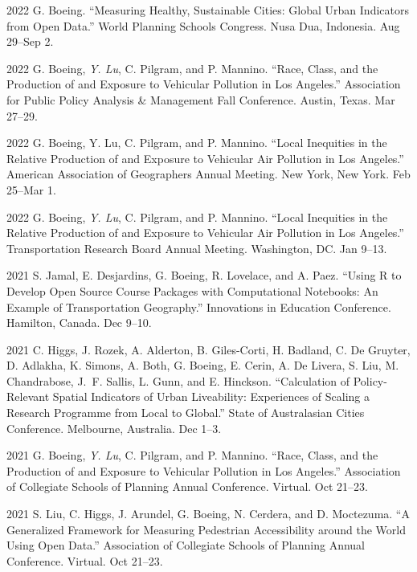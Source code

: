 \documentclass[11pt,letterpaper]{report} %
\begin{document}
\begin{tablist}
        \item[2022] \tab{}G. Boeing. \enquote{Measuring Healthy, Sustainable Cities: Global Urban Indicators from Open Data.} World Planning Schools Congress. Nusa Dua, Indonesia. Aug 29--Sep 2.

        \item[2022] \tab{}G. Boeing, \textit{Y. Lu}, C. Pilgram, and P. Mannino. \enquote{Race, Class, and the Production of and Exposure to Vehicular Pollution in Los Angeles.} Association for Public Policy Analysis \& Management Fall Conference. Austin, Texas. Mar 27--29.

        \item[2022] \tab{}G. Boeing, Y. Lu, C. Pilgram, and P. Mannino. \enquote{Local Inequities in the Relative Production of and Exposure to Vehicular Air Pollution in Los Angeles.} American Association of Geographers Annual Meeting. New York, New York. Feb 25--Mar 1.

        \item[2022] \tab{}G. Boeing, \textit{Y. Lu}, C. Pilgram, and P. Mannino. \enquote{Local Inequities in the Relative Production of and Exposure to Vehicular Air Pollution in Los Angeles.} Transportation Research Board Annual Meeting. Washington, DC\@. Jan 9--13.

        \item[2021] \tab{}S. Jamal, E. Desjardins, G. Boeing, R. Lovelace, and A. Paez. \enquote{Using R to Develop Open Source Course Packages with Computational Notebooks: An Example of Transportation Geography.} Innovations in Education Conference. Hamilton, Canada. Dec 9--10.

        \item[2021] \tab{}C. Higgs, J. Rozek, A. Alderton, B. Giles-Corti, H. Badland, C. De Gruyter, D. Adlakha, K. Simons, A. Both, G. Boeing, E. Cerin, A. De Livera, S. Liu, M. Chandrabose, J.~F. Sallis, L. Gunn, and E. Hinckson. \enquote{Calculation of Policy-Relevant Spatial Indicators of Urban Liveability: Experiences of Scaling a Research Programme from Local to Global.} State of Australasian Cities Conference. Melbourne, Australia. Dec 1--3.

        \item[2021] \tab{}G. Boeing, \textit{Y. Lu}, C. Pilgram, and P. Mannino. \enquote{Race, Class, and the Production of and Exposure to Vehicular Pollution in Los Angeles.} Association of Collegiate Schools of Planning Annual Conference. Virtual. Oct 21--23.

        \item[2021] \tab{}S. Liu, C. Higgs, J. Arundel, G. Boeing, N. Cerdera, and D. Moctezuma. \enquote{A Generalized Framework for Measuring Pedestrian Accessibility around the World Using Open Data.} Association of Collegiate Schools of Planning Annual Conference. Virtual. Oct 21--23.


\end{tablist}
\end{document}
